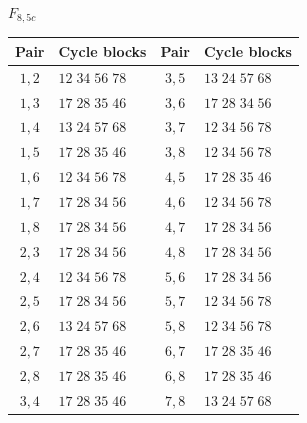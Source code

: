 \documentclass[11pt,a4paper]{article}
\theoremstyle{plain}
\theoremstyle{definition}
\numberwithin{equation}{section}
\begin{document}
\begin{center}\small
$F_{8,5c}$\par\nopagebreak[4]\smallskip\nopagebreak[4]
\begin{tabular}{cl@{\qquad}cl}\toprule Pair&Cycle blocks&Pair&Cycle blocks\\\midrule
$1,2$ & $12\;34\;56\;78$ & $3,5$ & $13\;24\;57\;68$ \\
$1,3$ & $17\;28\;35\;46$ & $3,6$ & $17\;28\;34\;56$ \\
$1,4$ & $13\;24\;57\;68$ & $3,7$ & $12\;34\;56\;78$ \\
$1,5$ & $17\;28\;35\;46$ & $3,8$ & $12\;34\;56\;78$ \\
$1,6$ & $12\;34\;56\;78$ & $4,5$ & $17\;28\;35\;46$ \\
$1,7$ & $17\;28\;34\;56$ & $4,6$ & $12\;34\;56\;78$ \\
$1,8$ & $17\;28\;34\;56$ & $4,7$ & $17\;28\;34\;56$ \\
$2,3$ & $17\;28\;34\;56$ & $4,8$ & $17\;28\;34\;56$ \\
$2,4$ & $12\;34\;56\;78$ & $5,6$ & $17\;28\;34\;56$ \\
$2,5$ & $17\;28\;34\;56$ & $5,7$ & $12\;34\;56\;78$ \\
$2,6$ & $13\;24\;57\;68$ & $5,8$ & $12\;34\;56\;78$ \\
$2,7$ & $17\;28\;35\;46$ & $6,7$ & $17\;28\;35\;46$ \\
$2,8$ & $17\;28\;35\;46$ & $6,8$ & $17\;28\;35\;46$ \\
$3,4$ & $17\;28\;35\;46$ & $7,8$ & $13\;24\;57\;68$ \\
\bottomrule\end{tabular}
\end{center}
\end{document}
